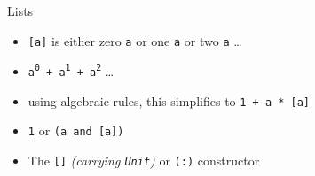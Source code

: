 \begin{frame}
\begin{block}{Lists}
\begin{itemize}
  \item<1-> \lstinline{[a]} is either zero \lstinline{a} or one \lstinline{a} or two \lstinline{a} \ldots
  \item<2-> \lstinline{a}\textsuperscript{\lstinline{0}}\lstinline{ + a}\textsuperscript{\lstinline{1}}\lstinline{ + a}\textsuperscript{\lstinline{2}} \ldots
  \item<3-> using algebraic rules, this simplifies to \lstinline{1 + a * [a]}
  \item<3-> \lstinline{1} or \lstinline{(a and [a])}
  \item<3-> The \lstinline{[]} \emph{(carrying \lstinline{Unit})} or \lstinline{(:)} constructor
\end{itemize}
\end{block}
\end{frame}

